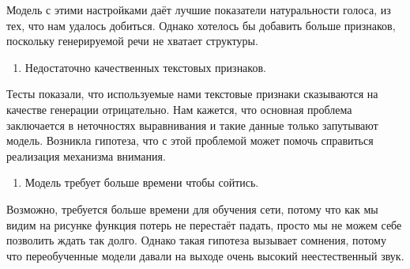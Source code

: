 \documentclass[../diploma.tex]{subfiles}
\begin{document}
Модель с этими настройками даёт лучшие показатели натуральности голоса, из тех, что нам удалось добиться. Однако хотелось бы добавить больше признаков, поскольку генерируемой речи не хватает структуры.

\begin{enumerate}[resume]
    \item Недостаточно качественных текстовых признаков.
\end{enumerate}

Тесты показали, что используемые нами текстовые признаки сказываются на качестве генерации отрицательно. Нам кажется, что основная проблема заключается в неточностях выравнивания и такие данные только запутывают модель. Возникла гипотеза, что с этой проблемой может помочь справиться реализация механизма внимания.

\begin{enumerate}[resume]
    \item Модель требует больше времени чтобы сойтись.
\end{enumerate}
Возможно, требуется больше времени для обучения сети, потому что как мы видим на рисунке \label{fig:perf} функция потерь не перестаёт падать, просто мы не можем себе позволить ждать так долго.
Однако такая гипотеза вызывает сомнения, потому что переобученные модели давали на выходе очень высокий неестественный звук.

\newpage
\end{document}
